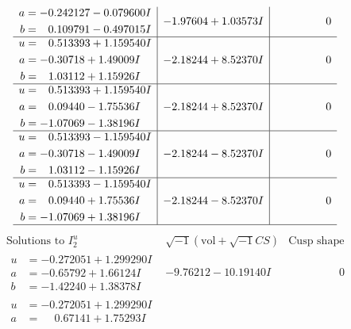 \documentclass[1p]{elsarticle_modified}
\theoremstyle{definition}
\newcommand{\I}{\sqrt{-1}}
\begin{document}
$$\begin{array}{c|c|c}
\begin{aligned}
a &= -0.242127 - 0.079600 I \\
b &= \phantom{-}0.109791 - 0.497015 I\end{aligned}
 & -1.97604 + 1.03573 I & \phantom{-0.000000 } 0 \\ \hline\begin{aligned}
u &= \phantom{-}0.513393 + 1.159540 I \\
a &= -0.30718 + 1.49009 I \\
b &= \phantom{-}1.03112 + 1.15926 I\end{aligned}
 & -2.18244 + 8.52370 I & \phantom{-0.000000 } 0 \\ \hline\begin{aligned}
u &= \phantom{-}0.513393 + 1.159540 I \\
a &= \phantom{-}0.09440 - 1.75536 I \\
b &= -1.07069 - 1.38196 I\end{aligned}
 & -2.18244 + 8.52370 I & \phantom{-0.000000 } 0 \\ \hline\begin{aligned}
u &= \phantom{-}0.513393 - 1.159540 I \\
a &= -0.30718 - 1.49009 I \\
b &= \phantom{-}1.03112 - 1.15926 I\end{aligned}
 & -2.18244 - 8.52370 I & \phantom{-0.000000 } 0 \\ \hline\begin{aligned}
u &= \phantom{-}0.513393 - 1.159540 I \\
a &= \phantom{-}0.09440 + 1.75536 I \\
b &= -1.07069 + 1.38196 I\end{aligned}
 & -2.18244 - 8.52370 I & \phantom{-0.000000 } 0\\
 \hline 
 \end{array}$$\newpage$$\begin{array}{c|c|c}  
\text{Solutions to }I^u_{2}& \I (\text{vol} + \sqrt{-1}CS) & \text{Cusp shape}\\
 \hline 
\begin{aligned}
u &= -0.272051 + 1.299290 I \\
a &= -0.65792 + 1.66124 I \\
b &= -1.42240 + 1.38378 I\end{aligned}
 & -9.76212 - 10.19140 I & \phantom{-0.000000 } 0 \\ \hline\begin{aligned}
u &= -0.272051 + 1.299290 I \\
a &= \phantom{-}0.67141 + 1.75293 I \\

\end{aligned}
\end{array}$$
\end{document}
